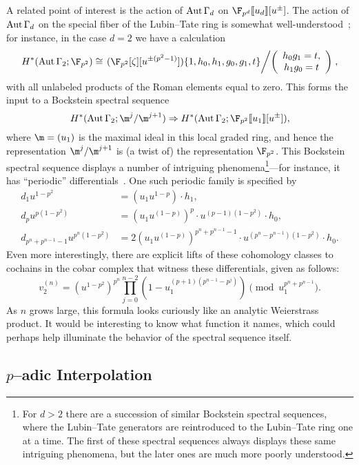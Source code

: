 A related point of interest is the action of \(\operatorname{Aut} \Gamma_d\) on \(\F_{p^d}\ps{u_d}[u^\pm]\).  The action of \(\operatorname{Aut} \Gamma_d\) on the special fiber of the Lubin--Tate ring is somewhat well-understood~\cite{RavenelCohomologyStabAlgs}; for instance, in the case \(d = 2\) we have a calculation \[H^*(\Aut \Gamma_2; \F_{p^2}) \cong \left.(\F_{p^2}[\zeta][u^{\pm(p^2-1)}])\{1, h_0, h_1, g_0, g_1, t\}\middle/\left(\begin{array}{c} h_0 g_1 = t, \\ h_1 g_0 = t \end{array}\right)\right. ,\] with all unlabeled products of the Roman elements equal to zero.  This forms the input to a Bockstein spectral sequence \[H^*(\Aut \Gamma_2; \m^j / \m^{j+1}) \Rightarrow H^*(\Aut \Gamma_2; \F_{p^2}\ps{u_1}[u^\pm]),\] where \(\m = (u_1)\) is the maximal ideal in this local graded ring, and hence the representation \(\m^j / \m^{j+1}\) is (a twist of) the representation \(\F_{p^2}\).  This Bockstein spectral sequence displays a number of intriguing phenomena\footnote{For \(d > 2\) there are a succession of similar Bockstein spectral sequences, where the Lubin--Tate generators are reintroduced to the Lubin--Tate ring one at a time.  The first of these spectral sequences always displays these same intriguing phenomena, but the later ones are much more poorly understood.}---for instance, it has ``periodic'' differentials~\cite{Sadofsky}.  One such periodic family is specified by
\begin{align*}
d_1 u^{1-p^2} & = (u_1 u^{1-p}) \cdot h_1, \\
d_p u^{p(1-p^2)} & = (u_1 u^{(1-p)})^p \cdot u^{(p-1)(1-p^2)} \cdot h_0, \\
d_{p^n+p^{n-1}-1} u^{p^n(1-p^2)} & = 2 (u_1 u^{(1-p)})^{p^n + p^{n-1} - 1} \cdot u^{(p^n - p^{n-1})(1 - p^2)} \cdot h_0.
\end{align*}
Even more interestingly, there are explicit lifts of these cohomology classes to cochains in the cobar complex that witness these differentials, given as follows: \[v_2^{(n)} = (u^{1-p^2})^{p^n} \prod_{j=0}^{n-2} \left(1 - u_1^{(p+1)(p^{n-1} - p^j)} \right) \pmod{u_1^{p^n + p^{n-1}}}.\]  As \(n\) grows large, this formula looks curiously like an analytic Weierstrass product.  It would be interesting to know what function it names, which could perhaps help illuminate the behavior of the spectral sequence itself.





\subsection*{\(p\)--adic Interpolation}


